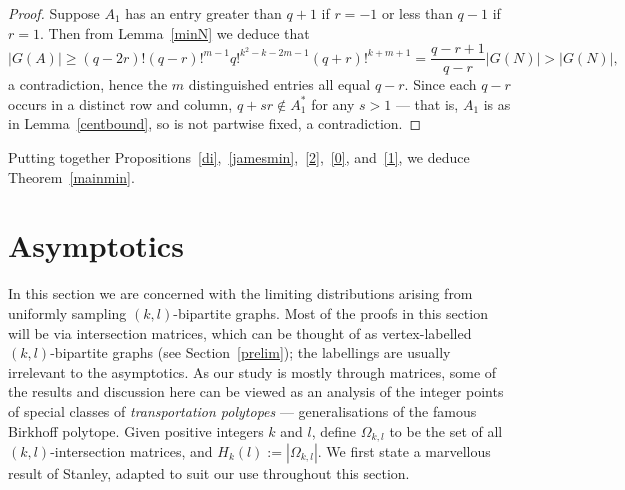 \documentclass{daj}
\theoremstyle{plain}
\theoremstyle{definition}
\begin{document}
\begin{proof}
Suppose $A_1$ has an entry greater than $q+1$ if $r=-1$ or less than $q-1$ if $r=1$. Then from Lemma~\ref{minN} we deduce that $$|G(A)|\geq (q-2r)!(q-r)!^{m-1}q!^{k^2-k-2m-1}(q+r)!^{k+m+1}=\frac{q-r+1}{q-r}|G(N)|>|G(N)|,$$
a contradiction, hence the $m$ distinguished entries all equal $q-r$. Since each $q-r$ occurs in a distinct row and column, $q+sr\not\in A_1^*$ for any $s>1$ --- that is, $A_1$ is as in Lemma~\ref{centbound}, so is not partwise fixed, a contradiction.
\end{proof}
Putting together Propositions~\ref{di},~\ref{jamesmin},~\ref{2},~\ref{0}, and~\ref{1}, we deduce Theorem~\ref{mainmin}.

\section{Asymptotics}\label{probaut}
In this section we are concerned with the limiting distributions arising from uniformly sampling $(k,l)$-bipartite graphs. 
Most of the proofs in this section will be via intersection matrices, which can be thought of as vertex-labelled $(k,l)$-bipartite graphs (see Section~\ref{prelim}); the labellings are usually irrelevant to the asymptotics. As our study is mostly through matrices, some of the results and discussion here can be viewed as an analysis of the integer points of special classes of \emph{transportation polytopes} --- generalisations of the famous Birkhoff polytope. Given positive integers $k$ and $l$, define $\Omega_{k,l}$ to be the set of all $(k,l)$-intersection matrices, and $H_k(l):=|\Omega_{k,l}|.$ We first state a marvellous result of Stanley, adapted to suit our use throughout this section. 
\end{document}
